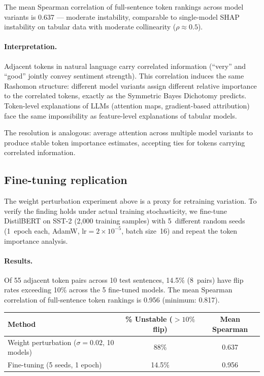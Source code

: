 \documentclass{article}
\begin{document}
The mean Spearman correlation of full-sentence token rankings
across model variants is 0.637 --- moderate instability, comparable
to single-model SHAP instability on tabular data with moderate
collinearity ($\rho \approx 0.5$).

\paragraph{Interpretation.}
Adjacent tokens in natural language carry correlated information
(``very'' and ``good'' jointly convey sentiment strength). This
correlation induces the same Rashomon structure: different model
variants assign different relative importance to the correlated
tokens, exactly as the Symmetric Bayes Dichotomy predicts.
Token-level explanations of LLMs (attention maps, gradient-based
attribution) face the same impossibility as feature-level
explanations of tabular models.

The resolution is analogous: average attention across multiple
model variants to produce stable token importance estimates,
accepting ties for tokens carrying correlated information.

\subsection{Fine-tuning replication}

The weight perturbation experiment above is a proxy for retraining
variation. To verify the finding holds under actual training
stochasticity, we fine-tune DistilBERT on SST-2 (2{,}000 training
samples) with 5~different random seeds (1~epoch each, AdamW,
$\text{lr}{=}2{\times}10^{-5}$, batch size~16) and repeat the
token importance analysis.

\paragraph{Results.}
Of 55 adjacent token pairs across 10 test sentences, 14.5\%
(8~pairs) have flip rates exceeding 10\% across the 5 fine-tuned
models. The mean Spearman correlation of full-sentence token
rankings is 0.956 (minimum: 0.817).

\begin{center}
\small
\begin{tabular}{@{}p{6cm}cc@{}}
\toprule
Method & \% Unstable ($>10\%$ flip) & Mean Spearman \\
\midrule
Weight perturbation ($\sigma{=}0.02$, 10 models) & 88\% & 0.637 \\
Fine-tuning (5 seeds, 1 epoch) & 14.5\% & 0.956 \\
\bottomrule
\end{tabular}
\end{center}
\end{document}

